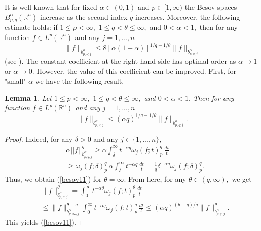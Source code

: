 \documentclass[12pt,twoside,reqno]{amsart}
\numberwithin{equation}{section}
\newtheorem{lem}[teo]{Lemma}
\theoremstyle{definition}
\numberwithin{equation}{section}
\begin{document}
It is  well known that for fixed ${\alpha}\in (0,1)$ and $p\in [1,
\infty)$ the Besov spaces $B^{\alpha}_{p,q}({\mathbb{R}}^n)$ increase as the second
index $q$ increases. Moreover,  the following estimate holds: if
$1\le p<\infty,$ $1\le q<{\theta}\le\infty,$ and $0<{\alpha}<1,$ then for any
function $f\in L^p({\mathbb R^n})$ and any $j=1,...,n$
\begin{equation}\label{besov}
\|f\|_{b^{\alpha}_{p,{\theta};j}}\le
8[{\alpha}(1-{\alpha})]^{1/q-1/{\theta}}\|f\|_{b^{\alpha}_{p,q;j}}
\end{equation}
(see \cite[Lemma 2.2]{K2006}).
The constant coefficient at the right-hand side has optimal order as ${\alpha}\to 1$ or ${\alpha}\to 0.$
However, the value of this coefficient can be improved. First, for "small" ${\alpha}$ we have the following result.
\begin{lem}\label{BESOV1} Let $1\le p<\infty,$ $1\le q<{\theta}\le\infty,$ and $0<{\alpha}<1.$ Then
for any function $f\in L^p({\mathbb R^n})$ and any $j=1,...,n$
\begin{equation}\label{besov11}
\|f\|_{b^{\alpha}_{p,{\theta};j}}\le
({\alpha} q)^{1/q-1/{\theta}}\|f\|_{b^{\alpha}_{p,q;j}}.
\end{equation}
\end{lem}
\begin{proof} Indeed, for any ${\delta}>0$ and any $j\in\{1,...,n\}$,
$$
\begin{aligned}
&{\alpha}||f||_{b^{\alpha}_{p,q;j}}^q \ge {\alpha}\int_{\delta}^\infty t^{-{\alpha} q}{\omega}_j(f;t)_p^q\,\frac{dt}{t}\\
&\ge {\omega}_j(f;{\delta})_p^q\, {\alpha} \int_{\delta}^\infty t^{-{\alpha} q}\,\frac{dt}{t}=\frac{1}{q}{\delta}^{-{\alpha} q}{\omega}_j(f;{\delta})_p^q.
\end{aligned}
$$
Thus, we obtain (\ref{besov11}) for ${\theta}=\infty.$  From here, for any
 ${\theta}\in (q,\infty),$ we get
$$
\begin{aligned}
&\|f\|_{b^{\alpha}_{p,{\theta};j}}^{\theta} = \int_0^\infty t^{-{\alpha}
\theta}{\omega}_j(f;t)_p^\theta\,\frac{dt}{t}\\
&\le
\|f\|_{b^{\alpha}_{p,\infty;j}}^{{\theta}-q}\int_0^\infty t^{-{\alpha}
q}{\omega}_j(f;t)_p^q\,\frac{dt}{t}
 \le
({\alpha} q)^{({\theta}-q)/q}\|f\|_{b^{\alpha}_{p,q;j}}^{\theta}.
\end{aligned}
$$
This yields (\ref{besov11}).
\end{proof}
\end{document}
